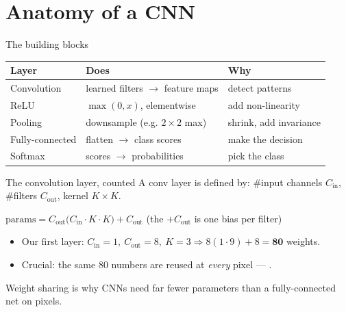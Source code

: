 \documentclass[10pt,aspectratio=169]{beamer}
\begin{document}
\section{Anatomy of a CNN}

\begin{frame}{The building blocks}
  \begin{center}
  \begin{tabular}{@{}lll@{}}
    \toprule
    \textbf{Layer} & \textbf{Does} & \textbf{Why} \\
    \midrule
    Convolution & learned filters $\rightarrow$ feature maps & detect patterns \\
    ReLU & $\max(0,x)$, elementwise & add non-linearity \\
    Pooling & downsample (e.g. $2\times2$ max) & shrink, add invariance \\
    Fully-connected & flatten $\rightarrow$ class scores & make the decision \\
    Softmax & scores $\rightarrow$ probabilities & pick the class \\
    \bottomrule
  \end{tabular}
  \end{center}
\end{frame}

\begin{frame}{The convolution layer, counted}
  A conv layer is defined by: \#input channels $C_{\text{in}}$, \#filters $C_{\text{out}}$, kernel $K\times K$.
  \begin{mathbox}
    $\text{params} = C_{\text{out}}\big(C_{\text{in}}\cdot K\cdot K\big) + C_{\text{out}}$ \quad(the $+C_{\text{out}}$ is one bias per filter)
  \end{mathbox}
  \begin{itemize}
    \item Our first layer: $C_{\text{in}}{=}1,\ C_{\text{out}}{=}8,\ K{=}3 \Rightarrow 8(1\cdot9)+8 = \mathbf{80}$ weights.
    \item Crucial: the same 80 numbers are reused at \emph{every} pixel --- .
  \end{itemize}
  \begin{goodbox}
    Weight sharing is why CNNs need far fewer parameters than a fully-connected net on pixels.
  \end{goodbox}
\end{frame}
\end{document}
